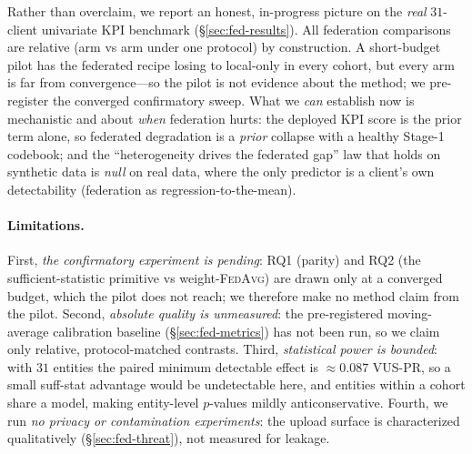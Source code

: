 \documentclass[11pt]{article}
\theoremstyle{plain}
\theoremstyle{definition}
\begin{document}
Rather than overclaim, we report an honest, in-progress picture on the \emph{real}
$31$-client univariate KPI benchmark (\S\ref{sec:fed-results}).
All federation comparisons are relative (arm vs arm under one protocol) by construction. A
short-budget pilot has the federated recipe losing to local-only in every cohort, but every
arm is far from convergence---so the pilot is not evidence about the method; we
pre-register the converged confirmatory sweep. What we \emph{can} establish now is
mechanistic and about \emph{when} federation hurts: the deployed KPI score is the prior
term alone, so federated degradation is a \emph{prior} collapse with a healthy Stage-1
codebook; and the ``heterogeneity drives the federated gap'' law that holds on synthetic
data is \emph{null} on real data, where the only predictor is a client's own
detectability (federation as regression-to-the-mean).

\paragraph{Limitations.} First, \emph{the confirmatory experiment is pending}: RQ1
(parity) and RQ2 (the sufficient-statistic primitive vs weight-\textsc{FedAvg}) are drawn
only at a converged budget, which the pilot does not reach; we therefore make no method
claim from the pilot. Second, \emph{absolute quality is unmeasured}: the pre-registered
moving-average calibration baseline (\S\ref{sec:fed-metrics}) has not been run, so we claim
only relative, protocol-matched contrasts. Third, \emph{statistical power is bounded}: with $31$ entities the paired
minimum detectable effect is $\approx 0.087$ VUS-PR, so a small suff-stat advantage would
be undetectable here, and entities within a cohort share a model, making entity-level
$p$-values mildly anticonservative. Fourth, we run \emph{no privacy or contamination
experiments}: the upload surface is characterized qualitatively (\S\ref{sec:fed-threat}),
not measured for leakage.
\end{document}
